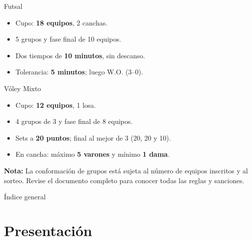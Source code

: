 {\begin{minipage}[t]{0.48\textwidth}
\begin{cajaTarjeta}{Futsal}
			\begin{itemize}
				\item Cupo: \textbf{18 equipos}, 2 canchas.
				\item 5 grupos y fase final de 10 equipos.
				\item Dos tiempos de \textbf{10 minutos}, sin descanso.
				\item Tolerancia: \textbf{5 minutos}; luego W.O. (3--0).
			\end{itemize}
		\end{cajaTarjeta}
		\vspace{0.45cm}
		\begin{cajaTarjeta}{Vóley Mixto}
			\begin{itemize}
				\item Cupo: \textbf{12 equipos}, 1 losa.
				\item 4 grupos de 3 y fase final de 8 equipos.
				\item Sets a \textbf{20 puntos}; final al mejor de 3 (20, 20 y 10).
				\item En cancha: máximo \textbf{5 varones} y mínimo \textbf{1 dama}.
			\end{itemize}
		\end{cajaTarjeta}
	\end{minipage}
	\vfill
	\begin{center}
		\begin{tcolorbox}[enhanced, colback=white, colframe=imegold, boxrule=0.9pt, arc=3mm,
			width=0.92\textwidth, left=4mm, right=4mm, top=3mm, bottom=3mm]
			\centering
			\textbf{\textcolor{imedark}{Nota:}} La conformación de grupos está sujeta al número de equipos inscritos y al sorteo. Revise el documento completo para conocer todas las reglas y sanciones.
		\end{tcolorbox}
	\end{center}
	\clearpage
}



	\portadaFormal
	\resumenRapido

	\thispagestyle{fancy}
	\begin{cajaResumen}{Índice general}
		\tableofcontents
	\end{cajaResumen}
	\newpage

	\section{Presentación}

